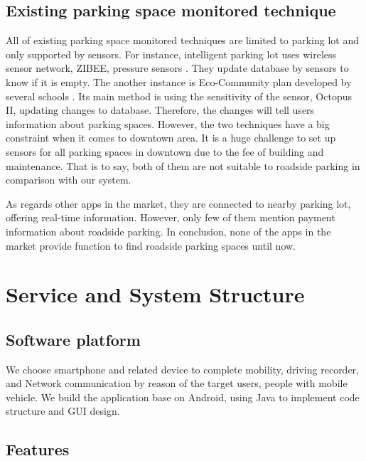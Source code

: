 \documentclass[journal,article,submit,moreauthors,pdftex,10pt,a4paper]{mdpi}
\begin{document}
%
\subsection{Existing parking space monitored technique}
%

All of existing parking space monitored techniques are limited to
parking lot and only supported by sensors. For instance, intelligent
parking lot uses wireless sensor network, ZIBEE, pressure sensors
\cite{PaymentSystem, IOV2015}.
They update database by sensors to know if it is empty. The another
instance is Eco-Community plan developed by several schools
\cite{EcoCommunity}. Its
main method is using the sensitivity of the sensor, Octopus II,
updating changes to database. Therefore, the changes will tell users
information about parking spaces. However, the two techniques have a big
constraint when it comes to downtown area. It is a huge challenge to set
up sensors for all parking spaces in downtown due to the fee of building
and maintenance. That is to say, both of them are not suitable to
roadside parking in comparison with our system.

As regards other apps in the market, they are connected to nearby
parking lot, offering real-time information. However, only few of
them mention payment information about roadside parking. In conclusion,
none of the apps in the market provide function to find roadside parking
spaces until now.

\section{Service and System Structure}\label{sec:service}

%
\subsection{Software platform}
%

We choose smartphone and related device to complete mobility, driving
recorder, and Network communication by reason of the target users,
people with mobile vehicle. We build the application base on Android,
using Java to implement code structure and GUI design.

%
\subsection{Features}
%
\end{document}
